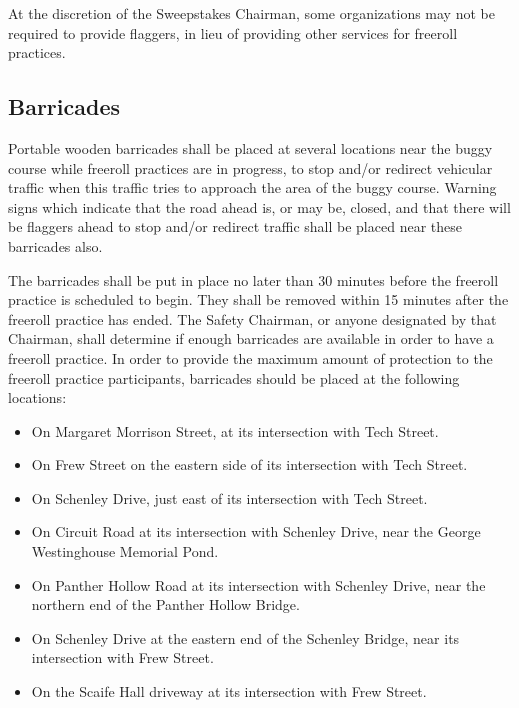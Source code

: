	At the discretion of the Sweepstakes Chairman, some organizations may not be
	required to provide flaggers, in lieu of providing other services for freeroll
	practices.

\subsection{Barricades}

	Portable wooden barricades shall be placed at several locations near the buggy
	course while freeroll practices are in progress, to stop and/or redirect
	vehicular traffic when this traffic tries to approach the area of the buggy
	course. Warning signs which indicate that the road ahead is, or may be, closed,
	and that there will be flaggers ahead to stop and/or redirect traffic shall be
	placed near these barricades also.

	The barricades shall be put in place no later than 30 minutes before the
	freeroll practice is scheduled to begin. They shall be removed within 15
	minutes after the freeroll practice has ended. The Safety Chairman, or anyone
	designated by that Chairman, shall determine if enough barricades are available
	in order to have a freeroll practice. In order to provide the maximum amount of
	protection to the freeroll practice participants, barricades should be placed
	at the following locations:

	\begin{itemize}

		\item On Margaret Morrison Street, at its intersection with Tech Street.

		\item On Frew Street on the eastern side of its intersection with Tech
		Street.

		\item On Schenley Drive, just east of its intersection with Tech Street.

		\item On Circuit Road at its intersection with Schenley Drive, near the
		George Westinghouse Memorial Pond.

		\item On Panther Hollow Road at its intersection with Schenley Drive, near
		the northern end of the Panther Hollow Bridge.

		\item On Schenley Drive at the eastern end of the Schenley Bridge, near its
		intersection with Frew Street. 

		\item On the Scaife Hall driveway at its intersection with Frew Street.

	\end{itemize}

